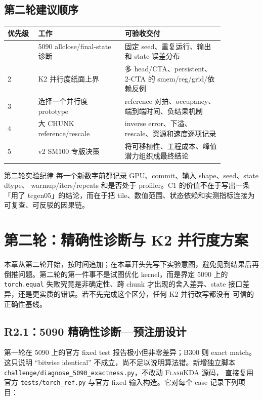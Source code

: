 \documentclass[11pt,a4paper,fontset=none]{ctexart}
\newcommand{\FlashKDA}{\textsc{FlashKDA}}
\newcommand{\code}[1]{\texttt{#1}}
\begin{document}
\subsection{第二轮建议顺序}

\begin{longtable}{@{}L{0.12\linewidth}L{0.34\linewidth}L{0.39\linewidth}@{}}
\toprule
优先级 & 工作 & 可验收交付 \\
\midrule
\endhead
\bottomrule
{} & 5090 allclose/final-state 诊断 & 固定 seed、重复运行、输出和 state 误差分布 \\
2 & K2 并行度纸面上界 & 多 head/CTA、persistent、2-CTA 的 smem/reg/grid/依赖反例 \\
3 & 选择一个并行度 prototype & reference 对拍、occupancy、端到端时间、负结果机制 \\
4 & 大 CHUNK reference/rescale & inverse error、下溢、rescale、资源和速度逐项记录 \\
5 & v2 SM100 专版决策 & 将可移植性、工程成本、峰值潜力组织成最终结论 \\
\end{longtable}

\begin{record}{第二轮实验纪律}
每一个新数字前都记录 GPU、commit、输入 shape、seed、state dtype、
warmup/iters/repeats 和是否处于 profiler。C1 的价值不在于写出一条
「用了 tcgen05」的结论，而在于把 tile、数值范围、状态依赖和实测指标连接为
可复查、可反驳的因果链。
\end{record}

\clearpage
\section{第二轮：精确性诊断与 K2 并行度方案}

本章从第二轮开始，按时间追加；在本章开头先写下实验意图，避免见到结果后再
倒推问题。第二轮的第一件事不是试图优化 kernel，而是界定 5090 上的
\code{torch.equal} 失败究竟是非确定性、跨 chunk 才出现的舍入差异、state
接口差异，还是更实质的错误。若不先完成这个区分，任何 K2 并行改写都没有
可信的正确性基线。

\subsection{R2.1：5090 精确性诊断---预注册设计}

第一轮在 5090 上的官方 fixed test 报告极小但非零差异；B300 则 exact match。
这只说明 ``bitwise identical'' 不成立，尚不足以说明算法错。新增独立脚本
\code{challenge/diagnose\_5090\_exactness.py}，不改动 \FlashKDA{} 源码，
直接复用官方 \code{tests/torch\_ref.py} 与官方 fixed 输入构造。它对每个 case
记录下列项目：
\end{document}
